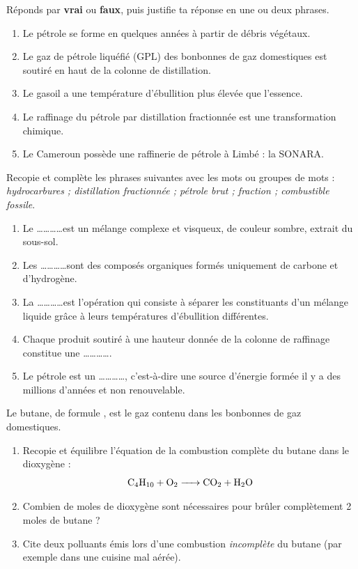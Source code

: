 \documentclass[11pt]{article}
\begin{document}
\begin{exercice}
Réponds par \textbf{vrai} ou \textbf{faux}, puis justifie ta réponse en une ou deux phrases.
\begin{enumerate}
\item Le pétrole se forme en quelques années à partir de débris végétaux.
\item Le gaz de pétrole liquéfié (GPL) des bonbonnes de gaz domestiques est soutiré en haut de la colonne de distillation.
\item Le gasoil a une température d'ébullition plus élevée que l'essence.
\item Le raffinage du pétrole par distillation fractionnée est une transformation chimique.
\item Le Cameroun possède une raffinerie de pétrole à Limbé : la SONARA.
\end{enumerate}
\end{exercice}

\begin{exercice}
Recopie et complète les phrases suivantes avec les mots ou groupes de mots : \emph{hydrocarbures ; distillation fractionnée ; pétrole brut ; fraction ; combustible fossile}.
\begin{enumerate}
\item Le \ldots\ldots\ldots\ldots est un mélange complexe et visqueux, de couleur sombre, extrait du sous-sol.
\item Les \ldots\ldots\ldots\ldots sont des composés organiques formés uniquement de carbone et d'hydrogène.
\item La \ldots\ldots\ldots\ldots est l'opération qui consiste à séparer les constituants d'un mélange liquide grâce à leurs températures d'ébullition différentes.
\item Chaque produit soutiré à une hauteur donnée de la colonne de raffinage constitue une \ldots\ldots\ldots\ldots.
\item Le pétrole est un \ldots\ldots\ldots\ldots, c'est-à-dire une source d'énergie formée il y a des millions d'années et non renouvelable.
\end{enumerate}
\end{exercice}

\begin{exercice}
Le butane, de formule , est le gaz contenu dans les bonbonnes de gaz domestiques.
\begin{enumerate}
\item Recopie et équilibre l'équation de la combustion complète du butane dans le dioxygène :
\[ \ce{C4H10 + O2 -> CO2 + H2O} \]
\item Combien de moles de dioxygène sont nécessaires pour brûler complètement \num{2} moles de butane ?
\item Cite deux polluants émis lors d'une combustion \emph{incomplète} du butane (par exemple dans une cuisine mal aérée).
\end{enumerate}
\end{exercice}
\end{document}
